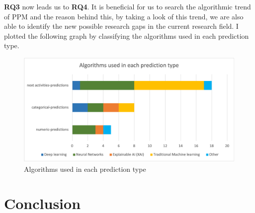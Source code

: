 \documentclass[runningheads]{llncs}
\begin{document}
		\textbf{RQ3} now leads us to \textbf{RQ4}. It is beneficial for us to search the algorithmic trend of PPM and the reason behind this, by taking a look of this trend, we are also able to identify the new possible research gaps in the current research field. I plotted the following graph by classifying the algorithms used in each prediction type. 
		
		\begin{figure}
		\includegraphics[scale=0.6]{Algorithms_usage.png}
		\centering
		\caption{Algorithms used in each prediction type}
		\end{figure}
		
		
		
		
		
		\section{Conclusion}
\end{document}

